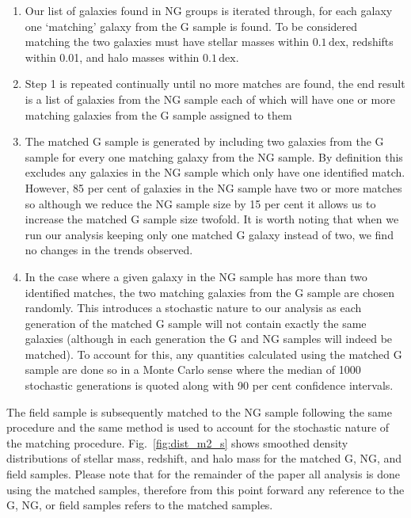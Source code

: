 \documentclass[a4paper,fleqn,usenatbib]{mnras}
\begin{document}
\begin{enumerate}
  \item Our list of galaxies found in NG groups is iterated through,
    for each galaxy one `matching' galaxy from the G sample is
    found.  To be considered matching the two galaxies must have
    stellar masses within $0.1\,\mathrm{dex}$, redshifts within 0.01,
    and halo masses within $0.1\,\mathrm{dex}$.

  \item Step 1 is repeated continually until no more matches are
    found, the end result is a list of galaxies from the NG
    sample each of which will have one or more matching galaxies from
    the G sample assigned to them
  
  \item The matched G sample is generated by including two galaxies
    from the G sample for every one matching galaxy from the NG
    sample.  By definition this excludes any galaxies in the NG
    sample which only have one identified match.  However, 85 per cent
    of galaxies
    in the NG sample have two or more matches so although we reduce
    the NG sample size by 15 per cent it allows us to increase the
    matched G sample size twofold.  It is worth noting that when we
    run our analysis keeping only one matched G galaxy instead of two,
    we find no changes in the trends observed.

  \item In the case where a given galaxy in the NG sample has more
    than two identified matches, the two matching galaxies from the G sample are
    chosen randomly.  This introduces a stochastic nature to our
    analysis as each generation of the matched G sample will not
    contain exactly the same galaxies (although in each generation the
    G and NG samples will indeed be matched).  To account for this, any
    quantities calculated using the matched G sample are done so in a
    Monte Carlo sense where the median of 1000 stochastic generations
    is quoted along with 90 per cent confidence intervals.
\end{enumerate}

\noindent
The field sample is subsequently matched to the NG sample following
the same procedure and the same method is used to account for the
stochastic nature of the matching procedure.  Fig.~\ref{fig:dist_m2_s}
shows smoothed density
distributions of stellar mass, redshift, and halo mass for the matched
G, NG, and field samples.  Please note that for the remainder of the
paper all analysis is done using the matched samples, therefore from
this point forward any reference to the G, NG, or field samples refers
to the matched samples.
\end{document}
